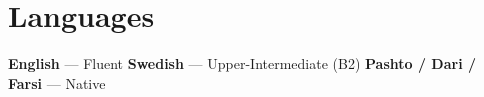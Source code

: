 \section*{Languages}

{\small\color{soft}
  \textbf{English} — Fluent\quad
  \textbf{Swedish} — Upper-Intermediate (B2)\quad
  \textbf{Pashto / Dari / Farsi} — Native
}
